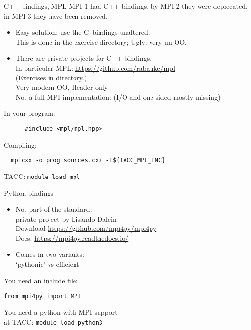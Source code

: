 \begin{mpl}
  \addtocounter{slidecount}{-1}
\begin{numberedframe}{C++ bindings, MPL}
  MPI-1 had C++ bindings, by MPI-2 they were deprecated, in MPI-3 they have been removed.
  \begin{itemize}
  \item Easy solution: use the C~bindings unaltered.\\
    This is done in the  exercise directory;  Ugly: very un-OO.
  \item There are private projects for C++ bindings.\\
    In particular
    MPL: \url{https://github.com/rabauke/mpl}\\
    (Exercises in  directory.)\\
    Very modern OO,  Header-only\\
    Not a full MPI implementation: (I/O and one-sided mostly missing)
  \end{itemize}
    In your program:
    \begin{lstlisting}
      #include <mpl/mpl.hpp>
    \end{lstlisting}
    Compiling:
\begin{verbatim}
  mpicxx -o prog sources.cxx -I${TACC_MPL_INC}
\end{verbatim}
TACC: \texttt{module load mpl}
\end{numberedframe}
\end{mpl}

\begin{python}
  \addtocounter{slidecount}{-1}
\begin{numberedframe}{Python bindings}
    \label{sl:mpi-header-p}
    \begin{itemize}
    \item Not part of the standard:\\
      private project by Lisando Dalcin\\
      Download \url{https://github.com/mpi4py/mpi4py}\\
      Docs: \url{https://mpi4py.readthedocs.io/}
    \item Comes in two variants:\\
      `pythonic' vs efficient
    \end{itemize}
    You need an include file:
\begin{verbatim}
from mpi4py import MPI
\end{verbatim}
You need a python with MPI support\\
at TACC: \texttt{module load python3}
\end{numberedframe}
\end{python}

